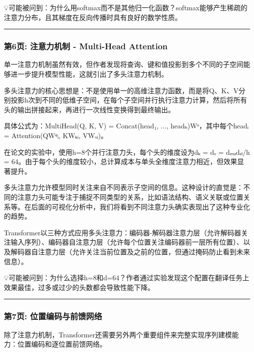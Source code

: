 \documentclass[11pt,a4paper]{article}
\begin{document}
💡可能被问到：为什么用softmax而不是其他归一化函数？softmax能够产生稀疏的注意力分布，且其梯度在反向传播时具有良好的数学性质。

\vspace{0.5em}\noindent\rule{\textwidth}{0.4pt}\vspace{0.5em}

\subsubsection*{第6页: 注意力机制 - Multi-Head Attention}

单一注意力机制虽然有效，但作者发现将查询、键和值投影到多个不同的子空间能够进一步提升模型性能，这就引出了多头注意力机制。

多头注意力的核心思想是：不是使用单一的高维注意力函数，而是将Q、K、V分别投影h次到不同的低维子空间，在每个子空间并行执行注意力计算，然后将所有头的输出拼接起来，再进行一次线性变换得到最终输出。

具体公式为：MultiHead(Q, K, V) = Concat(head₁, ..., headₕ)Wᵒ，其中每个headᵢ = Attention(QWᵠᵢ, KWₖᵢ, VWᵥᵢ)。

在论文的实验中，使用h=8个并行注意力头，每个头的维度设为dₖ = dᵥ = dₘₒdₑₗ/h = 64。由于每个头的维度较小，总计算成本与单头全维度注意力相近，但效果显著提升。

多头注意力允许模型同时关注来自不同表示子空间的信息。这种设计的直觉是：不同的注意力头可能专注于捕捉不同类型的关系，比如语法结构、语义关联或位置关系等。在后面的可视化分析中，我们将看到不同注意力头确实表现出了这种专业化的趋势。

Transformer以三种方式应用多头注意力：编码器-解码器注意力层（允许解码器关注输入序列）、编码器自注意力层（允许每个位置关注编码器前一层所有位置）、以及解码器自注意力层（允许关注当前位置及之前的位置，但通过掩码防止看到未来信息）。

💡可能被问到：为什么选择h=8和d=64？作者通过实验发现这个配置在翻译任务上效果最佳，过多或过少的头数都会导致性能下降。

\vspace{0.5em}\noindent\rule{\textwidth}{0.4pt}\vspace{0.5em}

\subsubsection*{第7页: 位置编码与前馈网络}

除了注意力机制，Transformer还需要另外两个重要组件来完整实现序列建模能力：位置编码和逐位置前馈网络。
\end{document}

